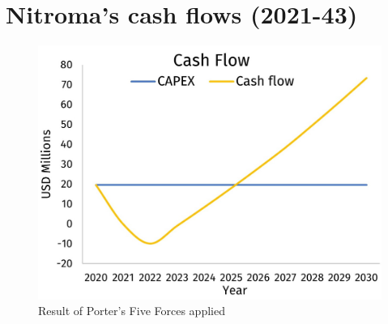 \section{Nitroma's cash flows (2021-43)}
\label{app:cash-flows-econ}

\begin{figure}[h]
\centering
 \includegraphics{chapters/6-economics/figures/Cash-flow.jpg}
 \caption{Result of Porter's Five Forces applied }
 \label{fig:Result of Porter's Five Forces applied to Nitroma}
\end{figure}